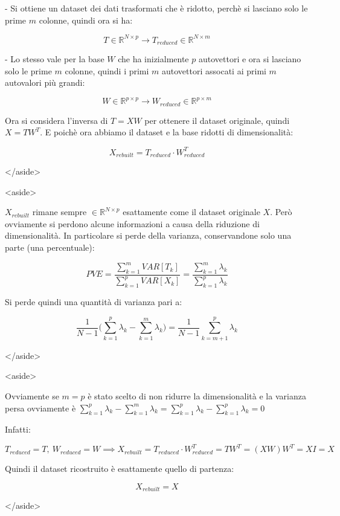 - Si ottiene un dataset dei dati trasformati che è ridotto, perchè si lasciano solo le prime $m$ colonne, quindi ora si ha:

$$
T\in\mathbb{R}^{N\times p}\rightarrow T_{reduced}\in\mathbb{R}^{N\times m}
$$

- Lo stesso vale per la base $W$ che ha inizialmente $p$ autovettori e ora si lasciano solo le prime $m$ colonne, quindi i primi $m$ autovettori assocati ai primi $m$ autovalori più grandi:

$$
W\in\mathbb{R}^{p\times p}\rightarrow W_{reduced}\in\mathbb{R}^{p\times m}
$$


Ora si considera l’inversa di $T=XW$ per ottenere il dataset originale, quindi $X=TW^T$. E poichè ora abbiamo il dataset e la base ridotti di dimensionalità:

$$
X_{rebuilt} = T_{reduced} \cdot W_{reduced}^T
$$

</aside>

<aside>


$X_{rebuilt}$ rimane sempre $\in\mathbb{R}^{N\times p}$ esattamente come il dataset originale $X$. Però ovviamente si perdono alcune informazioni a causa della riduzione di dimensionalità. In particolare si perde della varianza, conservandone solo una parte (una percentuale):

$$
PVE = \frac{\displaystyle\sum_{k=1}^{m}VAR[T_k]}{\displaystyle\sum_{k=1}^{p} VAR[X_k]}=
\frac{\displaystyle\sum_{k=1}^{m}\lambda_k}{\displaystyle\sum_{k=1}^{p} \lambda_k}
$$

Si perde quindi una quantità di varianza pari a:

$$
\frac{1}{N-1}\bigg(\sum_{k=1}^{p} \lambda_k-\sum_{k=1}^{m}\lambda_k\bigg)=\frac{1}{N-1}\sum_{k=m+1}^{p} \lambda_k

$$

</aside>

<aside>


Ovviamente se $m=p$ è stato scelto di non ridurre la dimensionalità e la varianza persa ovviamente è $\sum_{k=1}^{p} \lambda_k-\sum_{k=1}^{m}\lambda_k=\sum_{k=1}^{p} \lambda_k-\sum_{k=1}^{p}\lambda_k=0$

Infatti:

$$
T_{reduced}=T,\ W_{reduced}=W\implies X_{rebuilt} = T_{reduced} \cdot W_{reduced}^T=TW^T=(XW)W^T=XI=X
$$

Quindi il dataset ricostruito è esattamente quello di partenza:

$$
X_{rebuilt}=X
$$

</aside>